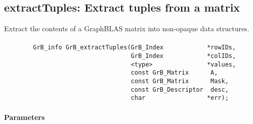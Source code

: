 
\subsection{{\sf extractTuples}: Extract tuples from a matrix}
\label{Sec:extractTuples}

Extract the contents of a GraphBLAS matrix into non-opaque data structures.

\paragraph{\syntax}

\begin{verbatim}
        GrB_info GrB_extractTuples(GrB_Index            *rowIDs,
                                   GrB_Index            *colIDs,
                                   <type>               *values, 
                                   const GrB_Matrix      A,
                                   const GrB_Matrix      Mask,
                                   const GrB_Descriptor  desc,
                                   char                 *err);
\end{verbatim}

\paragraph{Parameters}

